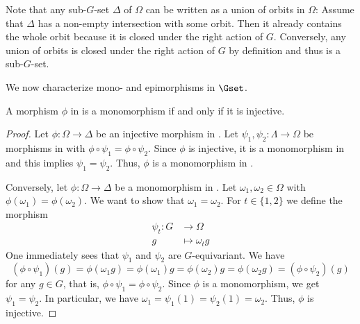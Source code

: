 \begin{rem}
Note that any sub-$G$-set $\Delta$ of $\Omega$ can be written as a union of orbits in $\Omega$: Assume that $\Delta$ has a non-empty intersection with some orbit. Then it already contains the whole orbit because it is closed under the right action of $G$. Conversely, any union of orbits is closed under the right action of $G$ by definition and thus is a sub-$G$-set.
\end{rem}

We now characterize mono- and epimorphisms in $\Gset$.

\begin{prop}[Monomorphisms]
A morphism $\phi$ in \Gset{} is a monomorphism if and only if it is injective.
\end{prop} 
\begin{proof}
Let $\phi\colon \Omega \to \Delta$ be an injective morphism in \Gset{}. Let $\psi_1,\psi_2\colon \Lambda \to \Omega$ be morphisms in \Gset{} with $\phi \circ \psi_1 = \phi \circ \psi_2$. Since $\phi$ is injective, it is a monomorphism in \Set{} and this implies $\psi_1 = \psi_2$. Thus, $\phi$ is a monomorphism in \Gset{}.

Conversely, let $\phi\colon \Omega \to \Delta$ be a monomorphism in \Gset{}. Let $\omega_1,\omega_2 \in \Omega$ with $\phi(\omega_1) = \phi(\omega_2)$. We want to show that $\omega_1 = \omega_2$. For $t \in \{1,2\}$ we define the morphism
\begin{align*}
\psi_t\colon G &\to \Omega\\
g &\mapsto \omega_tg
\end{align*}
One immediately sees that $\psi_1$ and $\psi_2$ are $G$-equivariant. We have \[(\phi \circ \psi_1)(g) = \phi(\omega_1 g) = \phi(\omega_1)g = \phi(\omega_2)g = \phi(\omega_2 g) = (\phi \circ \psi_2)(g)\] for any $g \in G$, that is, $\phi \circ \psi_1 = \phi \circ \psi_2$. Since $\phi$ is a monomorphism, we get $\psi_1 = \psi_2$. In particular, we have $\omega_1 = \psi_1(1) = \psi_2(1) = \omega_2$. Thus, $\phi$ is injective.
\end{proof}

